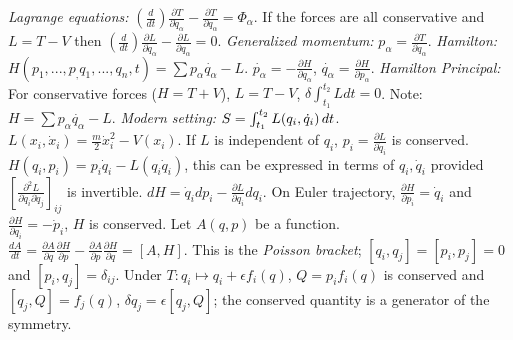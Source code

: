 \emph{Lagrange equations:} $({\frac d {dt}})
{\frac {\partial T} {\partial {\dot {q}}_{\alpha}}}-
{\frac {\partial T} {\partial q_{\alpha}}}= \Phi_{\alpha}$.  
If the forces are all conservative and $L=T-V$ then
$({\frac d {dt}})
{\frac {\partial L} {\partial {\dot {q}}_{\alpha}}}-
{\frac {\partial L} {\partial q_{\alpha}}}= 0$.  \emph{Generalized momentum:}
$p_{\alpha}= {\frac {\partial T} {\partial {\dot q}_{\alpha}}}$.
\emph{Hamilton:}
$H(p_1 , ..., p_, q_1 , ..., q_n , t)= \sum p_{\alpha} \dot{q_{\alpha}} - L$.
$\dot{p_{\alpha}}= -{\frac {\partial H} {\partial q_{\alpha}}}$,
$\dot{q_{\alpha}}= {\frac {\partial H} {\partial p_{\alpha}}}$.
\emph{Hamilton Principal:} For conservative forces ($H=T+V$),
$L=T-V$, $\delta \int_{t_1}^{t_2} L dt = 0$.  
Note: $H= \sum p_{\alpha} \dot{q_{\alpha}} - L$.
\emph{Modern setting:} $S= \int_{t_1}^{t_2} L(q_i, {\dot {q}}_i) \thinspace dt$.
$L(x_i, {\dot x}_i)= {\frac m 2} {\dot x}_i^2-V(x_i)$.  If $L$ is independent of $q_i$,
$p_i= {\frac {\partial L}{\partial {\dot q}_i}}$ is conserved.  $H(q_i, p_i)= p_i{\dot q}_i -L(q_i {\dot q}_i)$,
this can be expressed in terms of $q_i, {\dot q}_i$ 
provided $[{\frac {\partial^2 L} {\partial {\dot q}_i \partial {\dot q}_j}}]_{ij}$ is invertible.
$dH= {\dot q}_i dp_i - {\frac {\partial L}{\partial q_i}} d q_i$.  On Euler trajectory,
${\frac {\partial H}{\partial p_i}} = {\dot q}_i$ and
${\frac {\partial H}{\partial q_i}} = -{\dot p}_i$, $H$ is conserved.  Let $A(q,p)$ be a function.
${\frac {dA}{dt}}=
{\frac {\partial A}{\partial q}} {\frac {\partial H}{\partial p}}
-{\frac {\partial A}{\partial p}} {\frac {\partial H}{\partial q}}= [A,H]$.  This is the
\emph{Poisson bracket}; $[q_i, q_j]=[p_i, p_j]=0$ and $[p_i,q_j]= \delta_{ij}$.  Under
$T: q_i \mapsto q_i + \epsilon f_i(q)$, $Q= p_i f_i(q)$ is conserved and
$[q_j, Q]= f_j(q)$, $\delta q_j= \epsilon [q_j, Q]$; the conserved quantity is a generator of the
symmetry.
